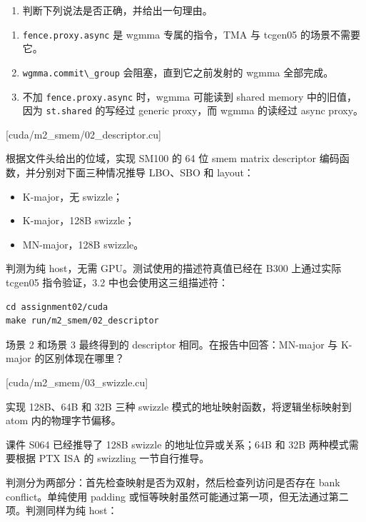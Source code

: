 \documentclass[11pt,a4paper,fontset=none]{ctexart}
\providecommand{\tightlist}{\setlength{\itemsep}{0pt}\setlength{\parskip}{0pt}}
\providecommand{\passthrough}[1]{#1}
\begin{document}
\begin{enumerate}
\def\labelenumi{(\alph{enumi})}
\setcounter{enumi}{1}
\tightlist
\item
  判断下列说法是否正确，并给出一句理由。
\end{enumerate}

\begin{enumerate}
\def\labelenumi{\arabic{enumi}.}
\tightlist
\item
  \passthrough{\lstinline!fence.proxy.async!} 是 wgmma 专属的指令，TMA
  与 tcgen05 的场景不需要它。
\item
  \passthrough{\lstinline!wgmma.commit\_group!} 会阻塞，直到它之前发射的
  wgmma 全部完成。
\item
  不加 \passthrough{\lstinline!fence.proxy.async!} 时，wgmma 可能读到
  shared memory 中的旧值，因为 \passthrough{\lstinline!st.shared!}
  的写经过 generic proxy，而 wgmma 的读经过 async proxy。
\end{enumerate}

[cuda/m2\_smem/02\_descriptor.cu]

根据文件头给出的位域，实现 SM100 的 64 位 smem matrix descriptor
编码函数，并分别对下面三种情况推导 LBO、SBO 和 layout：

\begin{itemize}
\tightlist
\item
  K-major，无 swizzle；
\item
  K-major，128B swizzle；
\item
  MN-major，128B swizzle。
\end{itemize}

判测为纯 host，无需 GPU。测试使用的描述符真值已经在 B300 上通过实际
tcgen05 指令验证，3.2 中也会使用这三组描述符：

\begin{lstlisting}
cd assignment02/cuda
make run/m2_smem/02_descriptor
\end{lstlisting}

场景 2 和场景 3 最终得到的 descriptor 相同。在报告中回答：MN-major 与
K-major 的区别体现在哪里？

[cuda/m2\_smem/03\_swizzle.cu]

实现 128B、64B 和 32B 三种 swizzle 模式的地址映射函数，将逻辑坐标映射到
atom 内的物理字节偏移。

课件 S064 已经推导了 128B swizzle 的地址位异或关系；64B 和 32B
两种模式需要根据 PTX ISA 的 swizzling 一节自行推导。

判测分为两部分：首先检查映射是否为双射，然后检查列访问是否存在 bank
conflict。单纯使用 padding
或恒等映射虽然可能通过第一项，但无法通过第二项。判测同样为纯 host：
\end{document}
